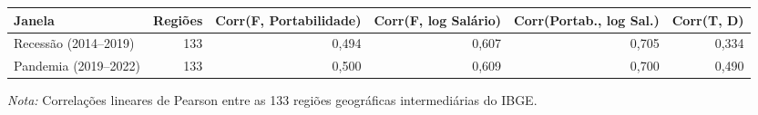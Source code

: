 \providecommand{\toprule}{\hline\hline}
\providecommand{\midrule}{\hline}
\providecommand{\bottomrule}{\hline\hline}
\providecommand{\addlinespace}[1][]{}
{\small
\renewcommand{\arraystretch}{1.12}
\begin{tabular}{lrrrrr}
\toprule
Janela & Regiões & Corr(F, Portabilidade) & Corr(F, log Salário) & Corr(Portab., log Sal.) & Corr(T, D) \\
\midrule
Recessão (2014–2019) & 133 & 0,494 & 0,607 & 0,705 & 0,334 \\
Pandemia (2019–2022) & 133 & 0,500 & 0,609 & 0,700 & 0,490 \\
\bottomrule
\end{tabular}
\vspace{2pt}
\par{\footnotesize \textit{Nota:} Correlações lineares de Pearson entre as 133 regiões geográficas intermediárias do IBGE.}
}
